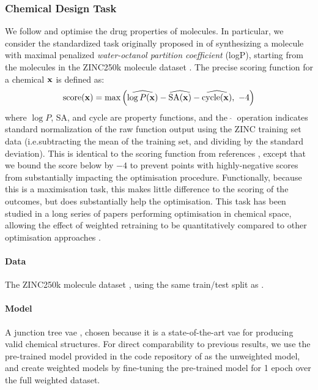 \subsubsection{Chemical Design Task}
We follow \citet{gomez2018} and optimise the drug properties of molecules.
In particular, we consider the standardized task originally proposed in \citet{gomez2018}
of synthesizing a molecule with maximal penalized \emph{water-octanol partition coefficient} (logP),
starting from the molecules in the ZINC250k molecule dataset \citep{irwin_zinc_2012}.
The precise scoring function for a chemical $\mathbf{x}$ is defined as:
\begin{equation*}
\text{score}(\mathbf{x}) = \max\left(\widehat{\log{P}(\mathbf{x})} -\widehat{\text{SA}(\mathbf{x})} - \widehat{\text{cycle}(\mathbf{x})}, \ -4\right)
\end{equation*}
where $\log{P}$, SA, and cycle are property functions,
and the $\ \widehat{}\ $ operation indicates standard normalization of the raw function output using the ZINC training set data
(i.e.\@ subtracting the mean of the training set, and dividing by the standard deviation).
This is identical to the scoring function from references \citep{kusner_grammar_2017,dai_syntax-directed_2018,jin_junction_2019,zhou_optimization_2019,you_graph_2018},
except that we bound the score below by $-4$ to prevent points with highly-negative scores from substantially impacting the optimisation procedure.
Functionally, because this is a maximisation task, this makes little difference to the scoring of the outcomes,
but does substantially help the optimisation.
This task has been studied in a long series of papers performing optimisation in chemical space,
allowing the effect of weighted retraining to be quantitatively compared to other optimisation approaches
\citep{kusner_grammar_2017,dai_syntax-directed_2018,jin_junction_2019,zhou_optimization_2019,you_graph_2018}.
\paragraph{Data} The ZINC250k molecule dataset \citep{irwin_zinc_2012}, using the same train/test split as \citep{jin_junction_2019}.
\paragraph{Model} A junction tree \gls{vae} \citep{jin_junction_2019},
chosen because it is a state-of-the-art \gls{vae} for producing valid chemical structures.
For direct comparability to previous results,
we use the pre-trained model provided in the code repository of \citep{jin_junction_2019} as the unweighted model,
and create weighted models by fine-tuning the pre-trained model for 1 epoch over the full weighted dataset.
